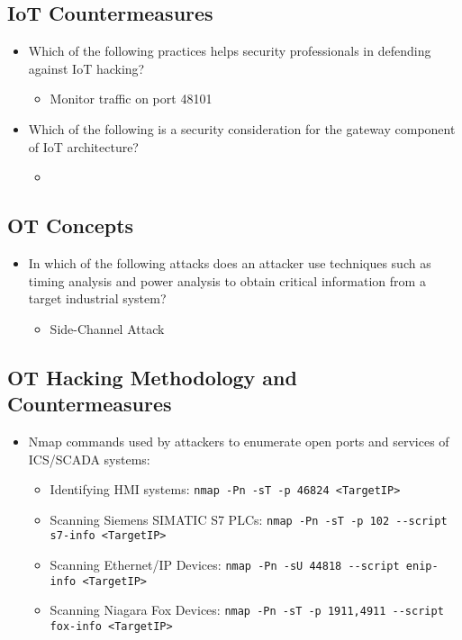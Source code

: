 \subsection{IoT Countermeasures}
\begin{itemize}
    \item Which of the following practices helps security professionals in defending against IoT hacking?
    \begin{itemize}
        \item Monitor traffic on port 48101
    \end{itemize}
    \item Which of the following is a security consideration for the gateway component of IoT architecture?
    \begin{itemize}
        \item 
    \end{itemize}
\end{itemize}
\subsection{OT Concepts}
\begin{itemize}
    \item In which of the following attacks does an attacker use techniques such as timing analysis and power analysis to obtain critical information from a target industrial system?
    \begin{itemize}
        \item Side-Channel Attack
    \end{itemize}
\end{itemize}
\subsection{OT Hacking Methodology and Countermeasures}
\begin{itemize}
    \item Nmap commands used by attackers to enumerate open ports and services of ICS/SCADA systems:
    \begin{itemize}
        \item Identifying HMI systems: \verb|nmap -Pn -sT -p 46824 <TargetIP>|
        \item Scanning Siemens SIMATIC S7 PLCs: \verb|nmap -Pn -sT -p 102 --script s7-info <TargetIP>|
        \item Scanning Ethernet/IP Devices: \verb|nmap -Pn -sU 44818 --script enip-info <TargetIP>|
        \item Scanning Niagara Fox Devices: \verb|nmap -Pn -sT -p 1911,4911 --script fox-info <TargetIP>|
    \end{itemize}
\end{itemize}


